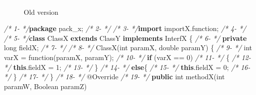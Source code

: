\documentclass[
]{article}
\newenvironment{Shaded}{\begin{snugshade}}{\end{snugshade}}
\newcommand{\AttributeTok}[1]{\textcolor[rgb]{0.77,0.63,0.00}{#1}}
\newcommand{\BuiltInTok}[1]{#1}
\newcommand{\CommentTok}[1]{\textcolor[rgb]{0.56,0.35,0.01}{\textit{#1}}}
\newcommand{\DataTypeTok}[1]{\textcolor[rgb]{0.13,0.29,0.53}{#1}}
\newcommand{\DecValTok}[1]{\textcolor[rgb]{0.00,0.00,0.81}{#1}}
\newcommand{\FunctionTok}[1]{\textcolor[rgb]{0.00,0.00,0.00}{#1}}
\newcommand{\ImportTok}[1]{#1}
\newcommand{\KeywordTok}[1]{\textcolor[rgb]{0.13,0.29,0.53}{\textbf{#1}}}
\newcommand{\NormalTok}[1]{#1}
\begin{document}
\normalsize

\begin{figure}
\centering
\includegraphics{figures/fake.png}
\caption{Old version \label{old_simple_code}}
\end{figure}

\newpage

\small

\begin{Shaded}
\begin{Highlighting}[]
\CommentTok{/*  1-                                   */}\KeywordTok{package}\ImportTok{ pack_x;}
\CommentTok{/*  2-                                   */}  
\CommentTok{/*  3-                                   */}\KeywordTok{import}\ImportTok{ importX.function;}
\CommentTok{/*  4-                                   */}
\CommentTok{/*  5-                                   */}\KeywordTok{class}\NormalTok{ ClassX }\KeywordTok{extends}\NormalTok{ ClassY }\KeywordTok{implements}\NormalTok{ InterfX \{}
\CommentTok{/*  6-                                   */}    \KeywordTok{private} \DataTypeTok{long}\NormalTok{ fieldX;}
\CommentTok{/*  7-                                   */}    
\CommentTok{/*  8-                                   */}    \FunctionTok{ClassX}\NormalTok{(}\DataTypeTok{int}\NormalTok{ paramX, }\DataTypeTok{double}\NormalTok{ paramY) \{      }
\CommentTok{/*  9-                                   */}        \DataTypeTok{int}\NormalTok{ varX = }\FunctionTok{function}\NormalTok{(paramX, paramY);     }
\CommentTok{/* 10-                                   */}        \KeywordTok{if}\NormalTok{ (varX == }\DecValTok{0}\NormalTok{)}
\CommentTok{/* 11-                                   */}\NormalTok{        \{}
\CommentTok{/* 12-                                   */}            \KeywordTok{this}\NormalTok{.}\FunctionTok{fieldX}\NormalTok{ = }\DecValTok{1}\NormalTok{;}
\CommentTok{/* 13-                                   */}\NormalTok{        \}            }
\CommentTok{/* 14-                                   */}        \KeywordTok{else}\NormalTok{\{}
\CommentTok{/* 15-                                   */}            \KeywordTok{this}\NormalTok{.}\FunctionTok{fieldX}\NormalTok{ = }\DecValTok{0}\NormalTok{;}
\CommentTok{/* 16-                                   */}\NormalTok{     \}}
\CommentTok{/* 17-                                   */}\NormalTok{    \}}
\CommentTok{/* 18-                                   */}    \AttributeTok{@Override}
\CommentTok{/* 19-                                   */}    \KeywordTok{public} \DataTypeTok{int} \FunctionTok{methodX}\NormalTok{(}\DataTypeTok{int}\NormalTok{ paramW, }\BuiltInTok{Boolean}\NormalTok{ paramZ)}

\end{Highlighting}
\end{Shaded}
\end{document}
